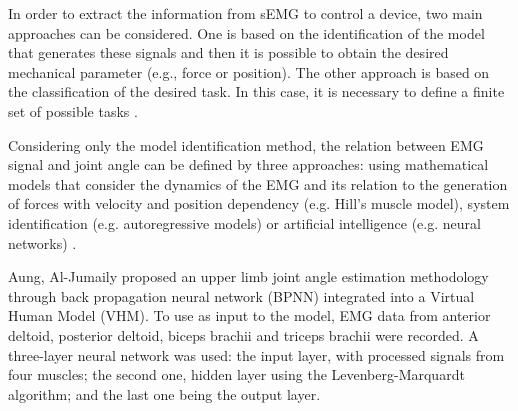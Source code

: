 \documentclass[letterpaper, 10 pt, conference]{ieeeconf}  %
\begin{document}
In order to extract the information from sEMG to control a device, two main approaches can be considered. One is based on the identification of the model that generates these signals and then it is possible to obtain the desired mechanical parameter (e.g., force or position). The other approach is based on the classification of the desired task. In this case, it is necessary to define a finite set of possible tasks  \cite{Fougner2012663}\cite{Fougner2011644}.

Considering only the model identification method, the relation between EMG signal and joint angle can be defined by three approaches: using mathematical models that consider the dynamics of the EMG and its relation to the generation of forces with velocity and position dependency (e.g. Hill's muscle model), system identification (e.g. autoregressive models) or artificial intelligence (e.g. neural networks) \cite{Anam2012988}.



Aung, Al-Jumaily \cite{Aung2013} proposed an upper limb joint angle estimation methodology through back propagation neural network (BPNN) integrated into a Virtual Human Model (VHM). To use as input to the model, EMG data from anterior deltoid, posterior deltoid, biceps brachii and triceps brachii were recorded.  A three-layer neural network was used: the input layer, with processed signals from four muscles; the second one, hidden layer using the Levenberg-Marquardt algorithm; and the last one being the output layer.
\end{document}
